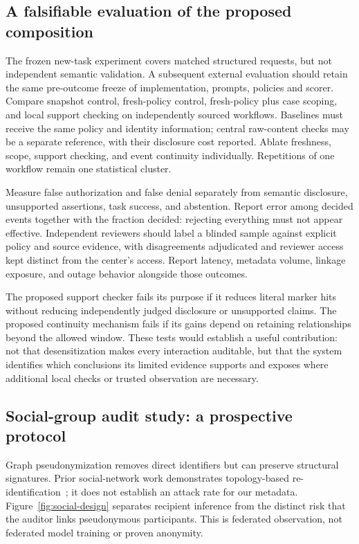

\subsection{A falsifiable evaluation of the proposed composition}
The frozen new-task experiment covers matched structured requests, but not
independent semantic validation. A subsequent external evaluation should retain
the same pre-outcome freeze of implementation, prompts, policies and scorer.
Compare snapshot control, fresh-policy control, fresh-policy plus case scoping,
and local support checking on independently sourced workflows. Baselines must receive the same policy and identity information;
central raw-content checks may be a separate reference, with their disclosure
cost reported. Ablate freshness, scope, support checking, and event continuity
individually. Repetitions of one workflow remain one statistical cluster.

Measure false authorization and false denial separately from semantic disclosure,
unsupported assertions, task success, and abstention. Report error among decided
events together with the fraction decided: rejecting everything must not appear
effective. Independent reviewers should label a blinded sample against explicit
policy and source evidence, with disagreements adjudicated and reviewer access
kept distinct from the center's access. Report latency, metadata volume, linkage
exposure, and outage behavior alongside those outcomes.

The proposed support checker fails its purpose if it reduces literal marker hits
without reducing independently judged disclosure or unsupported claims. The
proposed continuity mechanism fails if its gains depend on retaining relationships
beyond the allowed window. These tests would establish a useful contribution:
not that desensitization makes every interaction auditable, but that the system
identifies which conclusions its limited evidence supports and exposes where
additional local checks or trusted observation are necessary.

\subsection{Social-group audit study: a prospective protocol}
\label{sec:social-prospective}
Graph pseudonymization removes direct identifiers but can preserve structural
signatures. Prior social-network work demonstrates topology-based
re-identification~\cite{narayanan2009}; it does not establish an attack rate
for our metadata. Figure~\ref{fig:social-design} separates recipient inference
from the distinct risk that the auditor links pseudonymous participants.
This is federated observation, not federated model training or proven anonymity.

